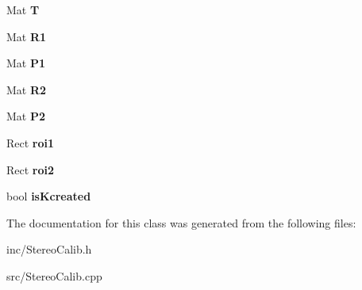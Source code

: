 \begin{DoxyCompactItemize}
\item 
Mat {\bfseries T}\hypertarget{class_stereo_calib_a8a691c626521ea41c641191aed961fef}{}\label{class_stereo_calib_a8a691c626521ea41c641191aed961fef}

\item 
Mat {\bfseries R1}\hypertarget{class_stereo_calib_a3d033e22e18823cd70293e1e15930bae}{}\label{class_stereo_calib_a3d033e22e18823cd70293e1e15930bae}

\item 
Mat {\bfseries P1}\hypertarget{class_stereo_calib_af5ebf388ee3dbf37e8ead9e97fd35edf}{}\label{class_stereo_calib_af5ebf388ee3dbf37e8ead9e97fd35edf}

\item 
Mat {\bfseries R2}\hypertarget{class_stereo_calib_abd3f37a1a9a35c52adbe712c76830638}{}\label{class_stereo_calib_abd3f37a1a9a35c52adbe712c76830638}

\item 
Mat {\bfseries P2}\hypertarget{class_stereo_calib_ae8704396ef9f76572c92f514af3a55a3}{}\label{class_stereo_calib_ae8704396ef9f76572c92f514af3a55a3}

\item 
Rect {\bfseries roi1}\hypertarget{class_stereo_calib_a7a2e42914c5e2690f1f3f8d22eb28c9c}{}\label{class_stereo_calib_a7a2e42914c5e2690f1f3f8d22eb28c9c}

\item 
Rect {\bfseries roi2}\hypertarget{class_stereo_calib_aa2a6d011851c59315217149cbe70c374}{}\label{class_stereo_calib_aa2a6d011851c59315217149cbe70c374}

\item 
bool {\bfseries is\+Kcreated}\hypertarget{class_stereo_calib_a780a6de79ba19e0dd1b51e1ccfb9dcd2}{}\label{class_stereo_calib_a780a6de79ba19e0dd1b51e1ccfb9dcd2}

\end{DoxyCompactItemize}


The documentation for this class was generated from the following files\+:\begin{DoxyCompactItemize}
\item 
inc/Stereo\+Calib.\+h\item 
src/Stereo\+Calib.\+cpp\end{DoxyCompactItemize}
